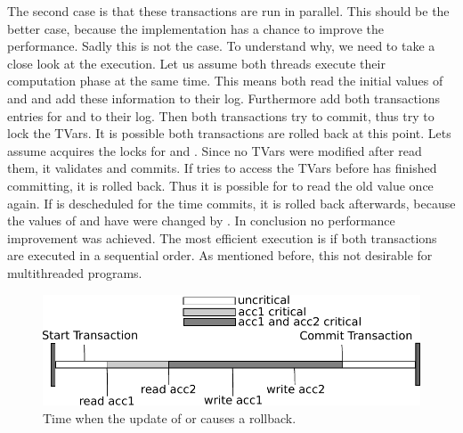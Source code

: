 The second case is that these transactions are run in parallel. This should be the better case, because the implementation
has a chance to improve the performance. Sadly this is not the case. To understand why, we need to take a close look at 
the execution. Let us assume both threads execute their computation phase at the same time. This means both read the initial 
values of  and  and add these information to their log. Furthermore add both transactions 
entries for  and  to their log. Then both transactions try to commit, thus try to lock 
the TVars. It is possible both transactions are rolled back at this point. Lets assume  acquires the locks 
for  and . Since no TVars were modified after  read them, it validates and commits.
If  tries to access the TVars before  has finished committing, it is rolled back. 
Thus it is possible for  to read the old value once again. If  is descheduled for the time
 commits, it is rolled back afterwards, because the values of  and  have were changed 
by . In conclusion no performance improvement was achieved. The most efficient execution is if both transactions
are executed in a sequential order. As mentioned before, this not desirable for multithreaded programs.

\begin{figure}
\centering
\includegraphics{Figures/CriticalValue}
\decoRule
\caption[CriticalValue]{Time when the update of  or  causes a rollback.}
\label{fig:criticalValue}
\end{figure}

